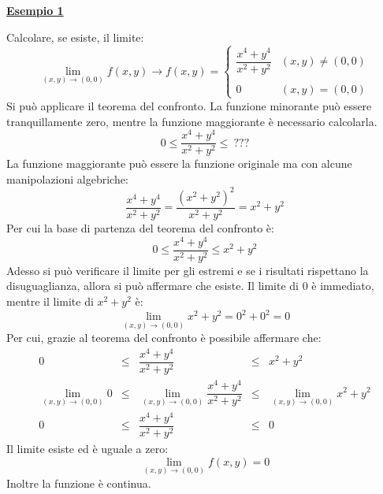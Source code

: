 \documentclass[a4paper]{article}
\newcommand{\example}[1]{\textcolor{Green4}{\textbf{#1}}}
\begin{document}
	\begin{flushleft}
		\example{\underline{Esempio 1}}
	\end{flushleft}
	Calcolare, se esiste, il limite:
	\begin{equation*}
		\displaystyle\lim_{\left(x,y\right) \rightarrow \left(0,0\right)} f\left(x,y\right) \rightarrow f\left(x,y\right) = 
		\begin{cases}
			\dfrac{x^{4}+y^{4}}{x^{2}+y^{2}} 	& \left(x,y\right) \ne \left(0,0\right) \\ \\
			0									& \left(x,y\right) = \left(0,0\right)
		\end{cases}
	\end{equation*}
	Si può applicare il teorema del confronto. La funzione minorante può essere tranquillamente zero, mentre la funzione maggiorante è necessario calcolarla.
	\begin{equation*}
		0 \le \dfrac{x^{4}+y^{4}}{x^{2}+y^{2}} \le \: ???
	\end{equation*}
	La funzione maggiorante può essere la funzione originale ma con alcune manipolazioni algebriche:
	\begin{equation*}
		\dfrac{x^{4}+y^{4}}{x^{2}+y^{2}} = \dfrac{\left(x^{2}+y^{2}\right)^{2}}{x^{2}+y^{2}} = x^{2}+y^{2}
	\end{equation*}
	Per cui la base di partenza del teorema del confronto è:
	\begin{equation*}
		0 \le \dfrac{x^{4}+y^{4}}{x^{2}+y^{2}} \le x^{2}+y^{2}
	\end{equation*}
	Adesso si può verificare il limite per gli estremi e se i risultati rispettano la disuguaglianza, allora si può affermare che esiste. Il limite di $0$ è immediato, mentre il limite di $x^{2} + y^{2}$ è:
	\begin{equation*}
		\displaystyle\lim_{\left(x,y\right) \rightarrow \left(0,0\right)} x^{2} + y^{2} = 0^{2} + 0^{2} = 0
	\end{equation*}
	Per cui, grazie al teorema del confronto è possibile affermare che:
	\begin{equation*}
		\begin{array}{rcccl}
			0 &\le& \dfrac{x^{4}+y^{4}}{x^{2}+y^{2}} &\le& x^{2}+y^{2} \\ [1em]
			\displaystyle\lim_{\left(x,y\right)\rightarrow\left(0,0\right)} 0 &\le& \displaystyle\lim_{\left(x,y\right)\rightarrow\left(0,0\right)}\dfrac{x^{4}+y^{4}}{x^{2}+y^{2}} &\le& \displaystyle\lim_{\left(x,y\right)\rightarrow\left(0,0\right)}x^{2}+y^{2} \\ [1em]
			0 &\le& \dfrac{x^{4}+y^{4}}{x^{2}+y^{2}} &\le& 0
		\end{array}
	\end{equation*}
	Il limite esiste ed è uguale a zero:
	\begin{equation*}
		\displaystyle\lim_{\left(x,y\right) \rightarrow \left(0,0\right)} f\left(x,y\right) = 0
	\end{equation*}
	Inoltre la funzione è continua.\newpage
\end{document}
